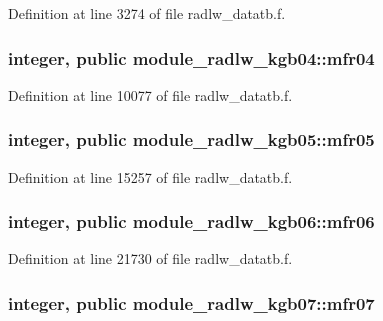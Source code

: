 Definition at line 3274 of file radlw\+\_\+datatb.\+f.

\subsubsection[{\texorpdfstring{mfr04}{mfr04}}]{\setlength{\rightskip}{0pt plus 5cm}integer, public module\+\_\+radlw\+\_\+kgb04\+::mfr04}\hypertarget{group__module__radlw__main_gab6ae25b4a793bf78ccd504685d639039}{}\label{group__module__radlw__main_gab6ae25b4a793bf78ccd504685d639039}


Definition at line 10077 of file radlw\+\_\+datatb.\+f.

\subsubsection[{\texorpdfstring{mfr05}{mfr05}}]{\setlength{\rightskip}{0pt plus 5cm}integer, public module\+\_\+radlw\+\_\+kgb05\+::mfr05}\hypertarget{group__module__radlw__main_ga44f07da9a7f99377f7d331249c475b80}{}\label{group__module__radlw__main_ga44f07da9a7f99377f7d331249c475b80}


Definition at line 15257 of file radlw\+\_\+datatb.\+f.

\subsubsection[{\texorpdfstring{mfr06}{mfr06}}]{\setlength{\rightskip}{0pt plus 5cm}integer, public module\+\_\+radlw\+\_\+kgb06\+::mfr06}\hypertarget{group__module__radlw__main_gaaf1f13cdb5c2888b416a91e8b17e41d8}{}\label{group__module__radlw__main_gaaf1f13cdb5c2888b416a91e8b17e41d8}


Definition at line 21730 of file radlw\+\_\+datatb.\+f.

\subsubsection[{\texorpdfstring{mfr07}{mfr07}}]{\setlength{\rightskip}{0pt plus 5cm}integer, public module\+\_\+radlw\+\_\+kgb07\+::mfr07}\hypertarget{group__module__radlw__main_ga0bd5d550553238ae13cbf57423d102c8}{}\label{group__module__radlw__main_ga0bd5d550553238ae13cbf57423d102c8}


